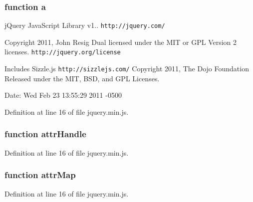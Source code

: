 \subsubsection[{a}]{\setlength{\rightskip}{0pt plus 5cm}function a}\label{jquery_8min_8js_aa4d4888597588a84fd5b1184d00c91f3}
j\-Query Java\-Script Library v1.. {\tt http\-://jquery.\-com/}

Copyright 2011, John Resig Dual licensed under the M\-I\-T or G\-P\-L Version 2 licenses. {\tt http\-://jquery.\-org/license}

Includes Sizzle.\-js {\tt http\-://sizzlejs.\-com/} Copyright 2011, The Dojo Foundation Released under the M\-I\-T, B\-S\-D, and G\-P\-L Licenses.

Date\-: Wed Feb 23 13\-:55\-:29 2011 -\/0500 

Definition at line 16 of file jquery.\-min.\-js.

\subsubsection[{attr\-Handle}]{\setlength{\rightskip}{0pt plus 5cm}function attr\-Handle}\label{jquery_8min_8js_aabb9e1be89b22783ae3983823c86d651}


Definition at line 16 of file jquery.\-min.\-js.

\subsubsection[{attr\-Map}]{\setlength{\rightskip}{0pt plus 5cm}function attr\-Map}\label{jquery_8min_8js_aa0004a0b86345972829628a1f2641c7e}


Definition at line 16 of file jquery.\-min.\-js.

